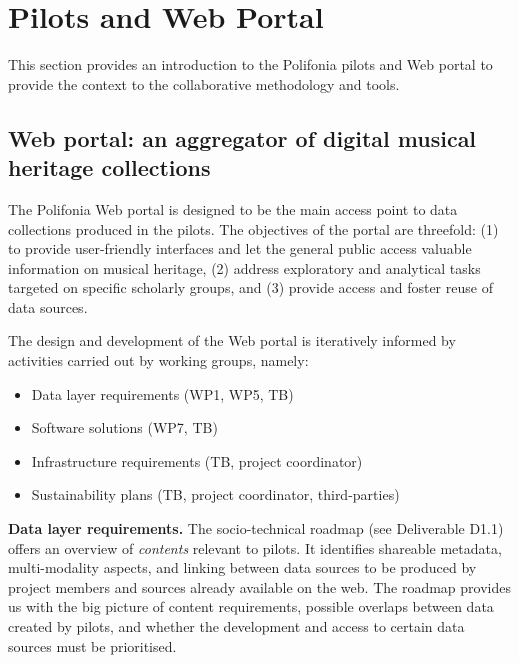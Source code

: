 \chapter{Pilots and Web Portal}\label{ch:pilot}
This section provides an introduction to the Polifonia pilots and Web portal to provide the context to the collaborative methodology and tools.
\section{Web portal: an aggregator of digital musical heritage collections}\label{sec:pilot:portal}

The Polifonia Web portal is designed to be the main access point to data collections produced in the pilots. 
The objectives of the portal are threefold: (1) to provide user-friendly interfaces and let the general public access valuable information on musical heritage, (2) address exploratory and analytical tasks targeted on specific scholarly groups, and (3) provide access and foster reuse of data sources.

The design and development of the Web portal is iteratively informed by activities carried out by working groups, namely:

\begin{itemize}
    \item Data layer requirements (WP1, WP5, TB)
    \item Software solutions (WP7, TB)
    \item Infrastructure requirements (TB, project coordinator)
    \item Sustainability plans (TB, project coordinator, third-parties)
\end{itemize}
 
\textbf{Data layer requirements.} The socio-technical roadmap (see Deliverable D1.1) offers an overview of \emph{contents} relevant to pilots. It identifies shareable metadata, multi-modality aspects, and linking between data sources to be produced by project members and sources already available on the web. The roadmap provides us with the big picture of content requirements, possible overlaps between data created by pilots, and whether the development and access to certain data sources must be prioritised.

